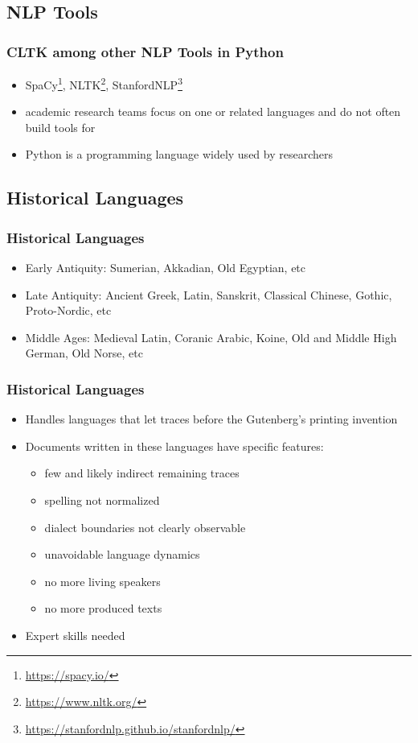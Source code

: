 \documentclass{beamer}
\begin{document}
\subsection{NLP Tools}
\begin{frame}
\frametitle{CLTK among other NLP Tools in Python}
\begin{itemize}
    
    \item SpaCy\footnote{\href{https://spacy.io/}{https://spacy.io/}}, NLTK\footnote{\href{https://www.nltk.org/}{https://www.nltk.org/}}, StanfordNLP\footnote{\href{https://stanfordnlp.github.io/stanfordnlp/}{https://stanfordnlp.github.io/stanfordnlp/}}
    \item academic research teams focus on one or related languages and do not often build tools for  
    \item Python is a programming language widely used by researchers
\end{itemize}
\end{frame}


\subsection{Historical Languages}

\begin{frame}
\frametitle{Historical Languages}
\begin{itemize}
    \item Early Antiquity: Sumerian, Akkadian, Old Egyptian, etc
    \item Late Antiquity: Ancient Greek, Latin, Sanskrit, Classical Chinese, Gothic, Proto-Nordic, etc
    \item Middle Ages: Medieval Latin, Coranic Arabic, Koine, Old and Middle High German, Old Norse, etc
\end{itemize}
\end{frame}

\begin{frame}
\frametitle{Historical Languages}
\begin{itemize}
    \item Handles languages that let traces before the Gutenberg's printing  invention
    \item Documents written in these languages have specific features:   
    \begin{itemize}
        \item few and likely indirect remaining traces
        \item spelling not normalized
        \item dialect boundaries not clearly observable
        \item unavoidable language dynamics  
        \item no more living speakers
        \item no more produced texts
        
    \end{itemize}
    \item Expert skills needed
\end{itemize}
\end{frame}
\end{document}
